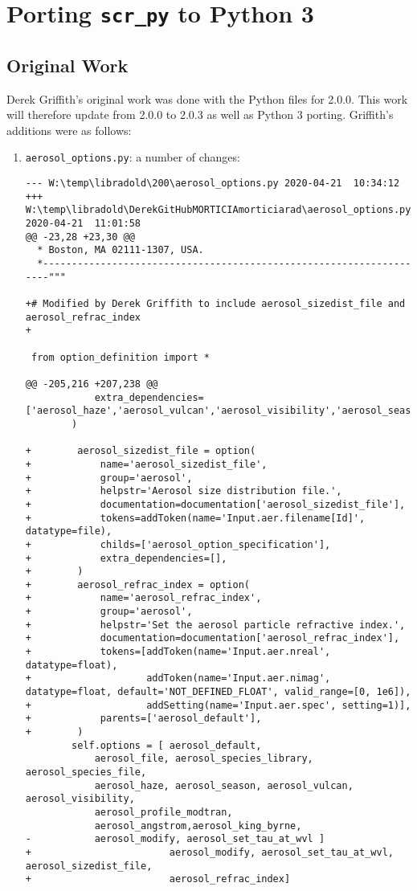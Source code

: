 \chapter{Porting \texttt{scr\_py} to Python 3}
\label{chap:Portingscr_pytoPython3}

\section{Original Work}
\label{sec:portingAppOriginalWork}

Derek Griffith's original work was done with the Python files for \libradtran{} 2.0.0.
This work will therefore update from 2.0.0 to 2.0.3 as well as Python 3 porting.  Griffith's additions were as follows:
\begin{enumerate}
\item \lstinline{aerosol_options.py}: a number of changes:

\begin{lstlisting}
--- W:\temp\libradold\200\aerosol_options.py 2020-04-21  10:34:12
+++ W:\temp\libradold\DerekGitHubMORTICIAmorticiarad\aerosol_options.py 2020-04-21  11:01:58
@@ -23,28 +23,30 @@
  * Boston, MA 02111-1307, USA.
  *--------------------------------------------------------------------"""
 
+# Modified by Derek Griffith to include aerosol_sizedist_file and aerosol_refrac_index
+
 
 from option_definition import *
 
@@ -205,216 +207,238 @@
 			extra_dependencies=['aerosol_haze','aerosol_vulcan','aerosol_visibility','aerosol_season'],
 		)
 	
+        aerosol_sizedist_file = option(
+            name='aerosol_sizedist_file',
+            group='aerosol',
+            helpstr='Aerosol size distribution file.',
+            documentation=documentation['aerosol_sizedist_file'],
+            tokens=addToken(name='Input.aer.filename[Id]', datatype=file),
+            childs=['aerosol_option_specification'],
+            extra_dependencies=[],
+        )
+        aerosol_refrac_index = option(
+            name='aerosol_refrac_index',
+            group='aerosol',
+            helpstr='Set the aerosol particle refractive index.',
+            documentation=documentation['aerosol_refrac_index'],
+            tokens=[addToken(name='Input.aer.nreal', datatype=float),
+                    addToken(name='Input.aer.nimag', datatype=float, default='NOT_DEFINED_FLOAT', valid_range=[0, 1e6]),
+                    addSetting(name='Input.aer.spec', setting=1)],
+            parents=['aerosol_default'],
+        )
 		self.options = [ aerosol_default,
 			aerosol_file, aerosol_species_library, aerosol_species_file, 
 			aerosol_haze, aerosol_season, aerosol_vulcan, aerosol_visibility,
 			aerosol_profile_modtran,
 			aerosol_angstrom,aerosol_king_byrne,
-			aerosol_modify, aerosol_set_tau_at_wvl ]
+                        aerosol_modify, aerosol_set_tau_at_wvl, aerosol_sizedist_file,
+                        aerosol_refrac_index]
 

\end{lstlisting}
\end{enumerate}
